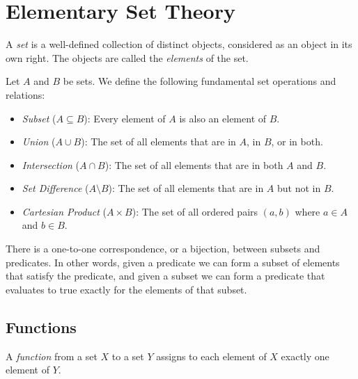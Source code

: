 \documentclass[../ium.tex]{subfiles}
\begin{document}
\section{Elementary Set Theory}

\begin{definition}
\begin{shaded*}
A \textit{set} is a well-defined collection of distinct objects, considered as an object in its own right. The objects are called the \textit{elements} of the set.
\end{shaded*}
\end{definition}

\begin{definition}
\begin{shaded*}
Let $A$ and $B$ be sets. We define the following fundamental set operations and relations:
\begin{itemize}
    \item \textit{Subset} ($A \subseteq B$): Every element of $A$ is also an element of $B$.
    \item \textit{Union} ($A \cup B$): The set of all elements that are in $A$, in $B$, or in both.
    \item \textit{Intersection} ($A \cap B$): The set of all elements that are in both $A$ and $B$.
    \item \textit{Set Difference} ($A \setminus B$): The set of all elements that are in $A$ but not in $B$.
    \item \textit{Cartesian Product} ($A \times B$): The set of all ordered pairs $(a, b)$ where $a \in A$ and $b \in B$.
\end{itemize}
\end{shaded*}
\end{definition}

\begin{remark}
There is a one-to-one correspondence, or a bijection, between subsets and predicates. In other words, given a predicate we can form a subset of elements that satisfy the predicate, and given a subset we can form a predicate that evaluates to true exactly for the elements of that subset.
\end{remark}

\subsection*{Functions}

\begin{definition}
\begin{shaded*}
A \textit{function} from a set $X$ to a set $Y$ assigns to each element of $X$ exactly one element of $Y$.
\end{shaded*}
\end{definition}
\end{document}

